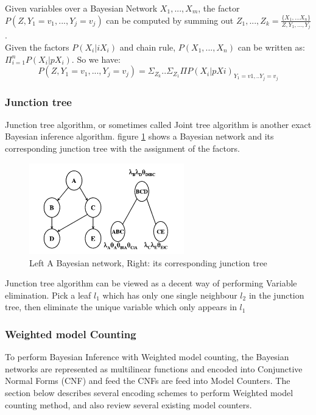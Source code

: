         Given variables over a Bayesian Network $X_{1}, ... , X_{m}$, the factor $P(Z, Y_{1}=v_{1}, ... , Y_{j}= v_{j})$ can be computed by summing out $Z_{1}, ..., Z_{k} =  \frac{\{X_{1}, ... X_{n}\}}{Z, Y_{1}, ..., Y_{j}}$.\\
        
        Given the factors $P(X_{i}|iX_{i})$ and chain rule, $P(X_{1}, ..., X_{n})$ can be written as: $\Pi_{i = 1}^{n} P(X_{i}|pX_{i})$. So we have:
        $$P(Z, Y_{1}=v_{1}, ... , Y_{j}= v_{j}) = \Sigma_{Z_{k}}.. \Sigma_{Z_{1}} \Pi P(X_{i}|pX{i})_{Y_{1} = v1, .. Y_{j} = v_{j}}$$
        \subsubsection{Junction tree}
        Junction tree algorithm, or sometimes called Joint tree algorithm is another exact Bayesian inference algorithm. figure \ref{fig:bayesjunc} shows a Bayesian network and its corresponding junction tree with the assignment of the factors.\\
        
        \begin{figure}
            \centering
            \includegraphics[width = 0.6\textwidth, height = 0.3\textwidth]{pic/bayesandjunctree.png}
            \caption{Left A Bayesian network, Right: its corresponding junction tree}
            \label{fig:bayesjunc}
        \end{figure}
        
        Junction tree algorithm can be viewed as a decent way of performing Variable elimination. Pick a leaf $l_{1}$ which has only one single neighbour $l_{2}$ in the junction tree, then eliminate the unique variable which only appears in $l_{1}$
        \subsubsection{Weighted model Counting}
        To perform Bayesian Inference with Weighted model counting, the Bayesian networks are represented as multi\-linear functions and encoded into Conjunctive Normal Forms (CNF) and feed the CNFs are feed into Model Counters. The section below describes several encoding schemes to perform Weighted model counting method, and also review several existing model counters.
    
